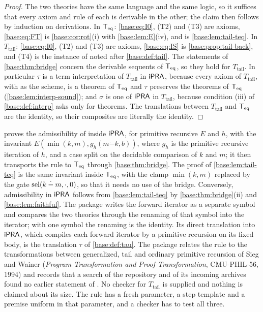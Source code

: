 \begin{proof}
The two theories have the same language and the same logic, so it suffices
that every axiom and rule of each is derivable in the other; the claim then
follows by induction on derivations.  In $\mathsf{T}_{\mathrm{eq}}$: \eqref{base:eq:I0}, (T2)
and (T3) are axioms, \eqref{base:eq:FT} is \cref{base:cor:rot}(i) with
\cref{base:lem:E}(iv), and  is \cref{base:lem:tail-teq}.  In
$T_{\mathrm{tail}}$: \eqref{base:eq:I0}, (T2) and (T3) are axioms,
\eqref{base:eq:IS} is \cref{base:prop:tail-back}, and (T4) is the instance of
 noted after \cref{base:def:tail}.  The statements of
\cref{base:thm:bridge} concern the derivable sequents of $\mathsf{T}_{\mathrm{eq}}$, so they
hold for $T_{\mathrm{tail}}$.  In particular $\tau$ is a term interpretation
of $T_{\mathrm{tail}}$ in $\mathsf{iPRA}$, because every axiom of $T_{\mathrm{tail}}$,
with  as the scheme, is a theorem of $\mathsf{T}_{\mathrm{eq}}$ and $\tau$ preserves
the theorems of $\mathsf{T}_{\mathrm{eq}}$ (\cref{base:lem:interp-sound}); and $\sigma$ is one of
$\mathsf{iPRA}$ in $T_{\mathrm{tail}}$, because condition (iii) of
\cref{base:def:interp} asks only for theorems.  The translations between
$T_{\mathrm{tail}}$ and $\mathsf{T}_{\mathrm{eq}}$ are the identity, so their composites are
literally the identity.
\end{proof}

\begin{remark}
\label{base:rem:tail}
 proves the admissibility of  inside
$\mathsf{iPRA}$, for primitive recursive $E$ and $h$, with the invariant
$E(\min(k,m),g_h(m\mathbin{\dot-}k,b))$, where $g_h$ is the primitive
recursive iteration of $h$, and a case split on the decidable comparison of
$k$ and $m$; it then transports the rule to $\mathsf{T}_{\mathrm{eq}}$ through
\cref{base:thm:bridge}.  The proof of \cref{base:lem:tail-teq} is the same
invariant inside $\mathsf{T}_{\mathrm{eq}}$, with the clamp $\min(k,m)$ replaced by the gate
$\operatorname{sel}(k\mathbin{\dot-}m,\cdot,0)$, so that it needs no use of the bridge.
Conversely, admissibility in $\mathsf{iPRA}$ follows from \cref{base:lem:tail-teq}
by \cref{base:thm:bridge}(ii) and \cref{base:lem:faithful}.  The package
writes the forward iterator as a separate symbol and compares the two
theories through the renaming of that symbol into the iterator; with one
symbol the renaming is the identity.  Its direct translation into $\mathsf{iPRA}$,
which compiles each forward iterator by a primitive recursion on its fixed
body, is the translation $\tau$ of \cref{base:def:tau}.  The package relates
the rule to the transformations between generalized, tail and ordinary
primitive recursion of Sieg and Wainer (\emph{Program Transformation and
Proof Transformation}, CMU-PHIL-56, 1994) and records that a search of the
repository and of its incoming archives found no earlier statement of
.  No checker for $T_{\mathrm{tail}}$ is supplied and nothing
is claimed about its size.  The rule has a fresh parameter, a step
template and a premise uniform in that parameter, and a checker has to test
all three.
\end{remark}


